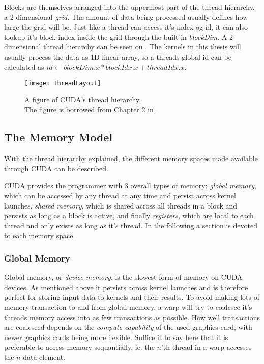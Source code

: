 
Blocks are themselves arranged into the uppermost part of the thread
hierarchy, a 2 dimensional \textit{grid}. The amount of data being
processed usually defines how large the grid will be. Just like a
thread can access it's index og id, it can also lookup it's block
index inside the grid through the built-in \textit{blockDim}. A 2
dimensional thread hierarchy can be seen on
. The kernels in this thesis will usually
process the data as 1D linear array, so a threads global id can be
calculated as $id \leftarrow blockDim.x * blockIdx.x + threadIdx.x$.

\begin{figure}
  \centering
  \texttt{[image: ThreadLayout]}
  \caption{A figure of CUDA's thread hierarchy.\\ The figure is borrowed
    from Chapter 2 in .}
  \label{fig:threadLayout}
\end{figure}




\subsection{The Memory Model}

With the thread hierarchy explained, the different memory spaces made
available through CUDA can be described.  

CUDA provides the programmer with 3 overall types of memory:
\textit{global memory}, which can be accessed by any thread at any
time and persist across kernel launches, \textit{shared memory}, which
is shared across all threads in a block and persists as long as a
block is active, and finally \textit{registers}, which are local to
each thread and only exists as long as it's thread. In the following
a section is devoted to each memory space.

\subsubsection{Global Memory}


Global memory, or \textit{device memory}, is the slowest form of
memory on CUDA devices. As mentioned above it persists across kernel
launches and is therefore perfect for storing input data to kernels
and their results. To avoid making lots of memory transaction to and
from global memory, a warp will try to coalesce it's threads memory
access into as few transactions as possible. How well transactions are
coalesced depends on the \textit{compute capability} of the used
graphics card, with newer graphics cards being more flexible. Suffice
it to say here that it is preferable to access memory sequantially,
ie. the $n$'th thread in a warp accesses the $n$ data element.

